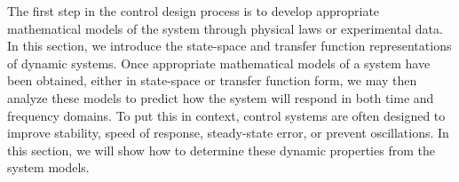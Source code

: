 The first step in the control design process is to develop appropriate mathematical models of the system through physical laws or experimental data. In this section, we introduce the state-space and transfer function representations of dynamic systems.
Once appropriate mathematical models of a system have been obtained, either in state-space or transfer function form, we may then analyze these models to predict how the system will respond in both time and frequency domains. To put this in context, control systems are often designed to improve stability, speed of response, steady-state error, or prevent oscillations. In this section, we will show how to determine these dynamic properties from the system models.
